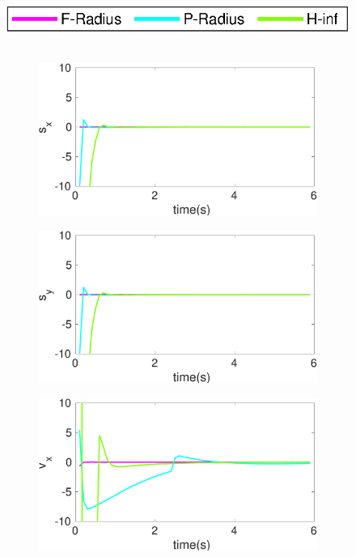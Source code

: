 \begin{figure}[!h]
\hspace*{\fill} \includegraphics[scale=0.8]{figures/ratelegend}\\\\
\begin{subfigure}{.5\linewidth}
\centering
\includegraphics[width=\linewidth]{figures/BoundChange/PM/pm_bound_changes_x}
\end{subfigure}
\begin{subfigure}{.5\linewidth}
\centering
\includegraphics[width=\linewidth]{figures/BoundChange/PM/pm_bound_changes_y}
\end{subfigure}
\begin{subfigure}{.5\linewidth}
\centering
\includegraphics[width=\linewidth]{figures/BoundChange/PM/pm_bound_changev_x}

\end{subfigure}
\end{figure}
